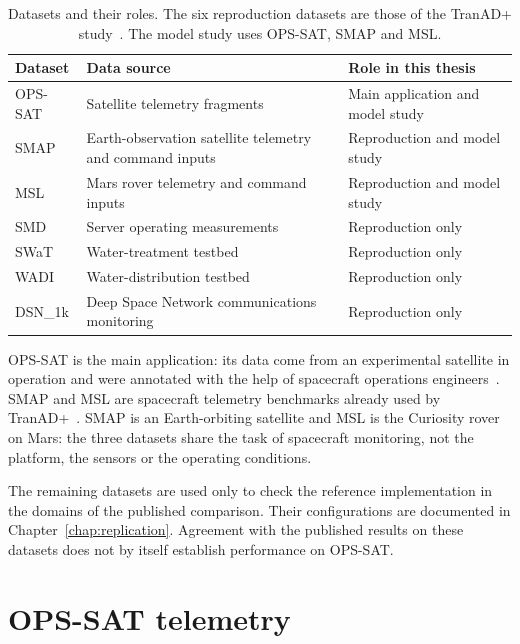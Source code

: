 \begin{table}[htbp]
  \centering
  \small
  \begin{tabularx}{\textwidth}{@{}lXX@{}}
    \toprule
    Dataset & Data source & Role in this thesis \\
    \midrule
    \acs{OPS-SAT} & Satellite telemetry fragments & Main application and model study \\
    \acs{SMAP} & Earth-observation satellite telemetry and command inputs & Reproduction and model study \\
    \acs{MSL} & Mars rover telemetry and command inputs & Reproduction and model study \\
    \acs{SMD} & Server operating measurements & Reproduction only \\
    SWaT & Water-treatment testbed & Reproduction only \\
    WADI & Water-distribution testbed & Reproduction only \\
    DSN\_1k & Deep Space Network communications monitoring & Reproduction only \\
    \bottomrule
  \end{tabularx}
  \caption{Datasets and their roles. The six reproduction datasets are those
  of the TranAD+ study~\cite{Yermakov2025TranADPlus}. The model study uses
  \acs{OPS-SAT}, \acs{SMAP} and \acs{MSL}.}
  \label{tab:datasets-roles}
\end{table}

\ac{OPS-SAT} is the main application: its data come from an experimental
satellite in operation and were annotated with the help of spacecraft
operations engineers~\cite{Ruszczak2025OPSSAT}. \ac{SMAP} and \ac{MSL} are
spacecraft telemetry benchmarks already used by
TranAD+~\cite{Hundman2018Spacecraft,Yermakov2025TranADPlus}. \ac{SMAP} is an
Earth-orbiting satellite and \ac{MSL} is the Curiosity rover on Mars: the
three datasets share the task of spacecraft monitoring, not the platform,
the sensors or the operating conditions.

The remaining datasets are used only to check the reference implementation
in the domains of the published comparison. Their configurations are
documented in Chapter~\ref{chap:replication}. Agreement with the published
results on these datasets does not by itself establish performance on
\ac{OPS-SAT}.

\section{OPS-SAT telemetry}
\label{sec:datasets-opssat}

